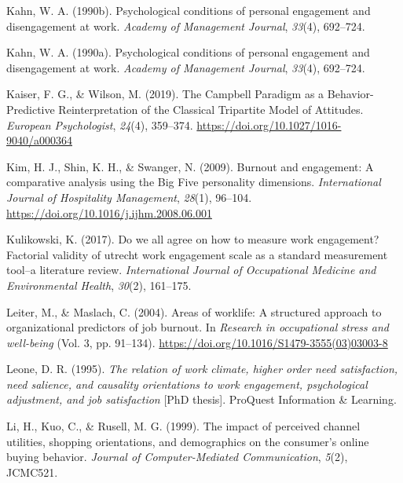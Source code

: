 \documentclass[
  man]{apa7}
\newlength{\cslhangindent}
\newlength{\cslentryspacingunit} %
\newenvironment{CSLReferences}[2] %
 {%
  \setlength{\parindent}{0pt}
  \ifodd #1
  \let\oldpar\par
  \def\par{\hangindent=\cslhangindent\oldpar}
  \fi
  \setlength{\parskip}{#2\cslentryspacingunit}
 }%
 {}
\begin{document}
\begin{CSLReferences}{1}{0}
\leavevmode{}%
Kahn, W. A. (1990b). Psychological conditions of personal engagement and disengagement at work. \emph{Academy of Management Journal}, \emph{33}(4), 692--724.

\leavevmode{}%
Kahn, W. A. (1990a). Psychological conditions of personal engagement and disengagement at work. \emph{Academy of Management Journal}, \emph{33}(4), 692--724.

\leavevmode{}%
Kaiser, F. G., \& Wilson, M. (2019). The {Campbell} {Paradigm} as a {Behavior}-{Predictive} {Reinterpretation} of the {Classical} {Tripartite} {Model} of {Attitudes}. \emph{European Psychologist}, \emph{24}(4), 359--374. \url{https://doi.org/10.1027/1016-9040/a000364}

\leavevmode{}%
Kim, H. J., Shin, K. H., \& Swanger, N. (2009). Burnout and engagement: {A} comparative analysis using the {Big} {Five} personality dimensions. \emph{International Journal of Hospitality Management}, \emph{28}(1), 96--104. \url{https://doi.org/10.1016/j.ijhm.2008.06.001}

\leavevmode{}%
Kulikowski, K. (2017). Do we all agree on how to measure work engagement? Factorial validity of utrecht work engagement scale as a standard measurement tool--a literature review. \emph{International Journal of Occupational Medicine and Environmental Health}, \emph{30}(2), 161--175.

\leavevmode{}%
Leiter, M., \& Maslach, C. (2004). Areas of worklife: A structured approach to organizational predictors of job burnout. In \emph{Research in occupational stress and well-being} (Vol. 3, pp. 91--134). \url{https://doi.org/10.1016/S1479-3555(03)03003-8}

\leavevmode{}%
Leone, D. R. (1995). \emph{The relation of work climate, higher order need satisfaction, need salience, and causality orientations to work engagement, psychological adjustment, and job satisfaction} {[}PhD thesis{]}. ProQuest Information \& Learning.

\leavevmode{}%
Li, H., Kuo, C., \& Rusell, M. G. (1999). The impact of perceived channel utilities, shopping orientations, and demographics on the consumer's online buying behavior. \emph{Journal of Computer-Mediated Communication}, \emph{5}(2), JCMC521.


\end{CSLReferences}
\end{document}
